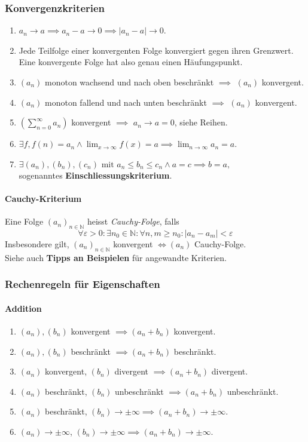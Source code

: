 \documentclass[a4paper, 9pt, DIV=24]{scrartcl}
\newcommand{\N}{\mathbb{N}}
\begin{document}
\subsubsection{Konvergenzkriterien}
\begin{enumerate}[label={(}\arabic*{)}]
\item $a_n \to a \implies a_n - a \to 0 \implies |a_n - a| \to 0$.
\item Jede Teilfolge einer konvergenten Folge konvergiert gegen ihren Grenzwert.
      Eine konvergente Folge hat also genau einen Häufungspunkt.
\item $(a_n)$ monoton wachsend und nach oben beschränkt $\implies$ $(a_n)$ konvergent.
\item $(a_n)$ monoton fallend und nach unten beschränkt $\implies$ $(a_n)$ konvergent.
\item $(\sum_{n=0}^{\infty} a_n)$ konvergent $\implies$ $a_n \to a = 0$, siehe Reihen.
\item $\exists f, f(n) = a_n \land \lim_{x\to\infty} f(x) = a \implies \lim_{n\to\infty} a_n = a$.
\item $\exists (a_n), (b_n), (c_n) \text{ mit } a_n \leq b_n \leq c_n \wedge a = c \implies b = a,$\\
      sogenanntes \textbf{Einschliessungskriterium}.
\end{enumerate}

\paragraph{Cauchy-Kriterium}
Eine Folge $(a_n)_{n\in\N}$ heisst \emph{Cauchy-Folge}, falls
 \[ \forall \varepsilon > 0: \exists n_0 \in\N: \forall n,m \geq n_0: |a_n - a_m| < \varepsilon \]
Insbesondere gilt, $(a_n)_{n\in\N}$ konvergent $\iff (a_n)$ Cauchy-Folge.\\[.2em]
Siehe auch \textbf{Tipps an Beispielen} für angewandte Kriterien.

\subsubsection{Rechenregeln für Eigenschaften}
\paragraph{Addition}
\begin{enumerate}[label={(}\arabic*{)}]
 \item $(a_n), (b_n)$ konvergent $\implies (a_n + b_n)$ konvergent.
 \item $(a_n), (b_n)$ beschränkt $\implies (a_n + b_n)$ beschränkt.
 \item $(a_n)$ konvergent, $(b_n)$ divergent $\implies (a_n + b_n)$ divergent.
 \item $(a_n)$ beschränkt, $(b_n)$ unbeschränkt $\implies (a_n + b_n)$ unbeschränkt.
 \item $(a_n)$ beschränkt, $(b_n) \to \pm \infty \implies (a_n + b_n) \to \pm \infty$.
 \item $(a_n) \to \pm\infty$, $(b_n) \to \pm\infty \implies (a_n + b_n) \to \pm\infty$.
\end{enumerate}
\end{document}
